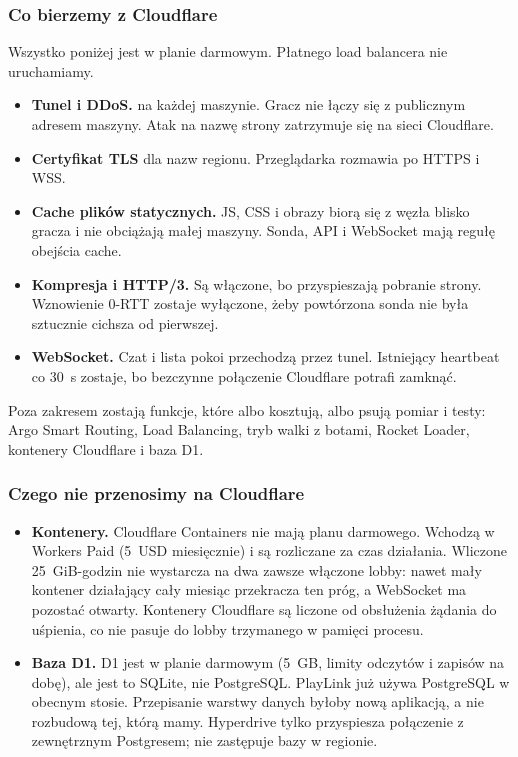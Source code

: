 \documentclass[12pt,a4paper]{article}
\newcommand{\code}[1]{\texttt{\detokenize{#1}}}
\begin{document}
\subsubsection{Co bierzemy z Cloudflare}
Wszystko poniżej jest w planie darmowym. Płatnego load balancera nie uruchamiamy.
\begin{itemize}
  \item \textbf{Tunel i DDoS.} \code{cloudflared} na każdej maszynie. Gracz nie
        łączy się z publicznym adresem maszyny. Atak na nazwę strony zatrzymuje
        się na sieci Cloudflare.
  \item \textbf{Certyfikat TLS} dla nazw regionu. Przeglądarka rozmawia po HTTPS i WSS.
  \item \textbf{Cache plików statycznych.} JS, CSS i obrazy biorą się z węzła
        blisko gracza i nie obciążają małej maszyny. Sonda, API i WebSocket
        mają regułę obejścia cache.
  \item \textbf{Kompresja i HTTP/3.} Są włączone, bo przyspieszają pobranie strony.
        Wznowienie 0-RTT zostaje wyłączone, żeby powtórzona sonda nie była
        sztucznie cichsza od pierwszej.
  \item \textbf{WebSocket.} Czat i lista pokoi przechodzą przez tunel. Istniejący
        heartbeat co 30~s zostaje, bo bezczynne połączenie Cloudflare potrafi zamknąć.
\end{itemize}
Poza zakresem zostają funkcje, które albo kosztują, albo psują pomiar i testy:
Argo Smart Routing, Load Balancing, tryb walki z botami, Rocket Loader,
kontenery Cloudflare i baza D1.

\subsubsection{Czego nie przenosimy na Cloudflare}
\begin{itemize}
  \item \textbf{Kontenery.} Cloudflare Containers nie mają planu darmowego.
        Wchodzą w Workers Paid (5~USD miesięcznie) i są rozliczane za czas
        działania. Wliczone 25~GiB-godzin nie wystarcza na dwa zawsze włączone
        lobby: nawet mały kontener działający cały miesiąc przekracza ten próg,
        a WebSocket ma pozostać otwarty. Kontenery Cloudflare są liczone od
        obsłużenia żądania do uśpienia, co nie pasuje do lobby trzymanego w
        pamięci procesu.
  \item \textbf{Baza D1.} D1 jest w planie darmowym (5~GB, limity odczytów
        i zapisów na dobę), ale jest to SQLite, nie PostgreSQL. PlayLink już
        używa PostgreSQL w obecnym stosie. Przepisanie warstwy danych
        byłoby nową aplikacją, a nie rozbudową tej, którą mamy. Hyperdrive tylko
        przyspiesza połączenie z zewnętrznym Postgresem; nie zastępuje bazy
        w regionie.
\end{itemize}
\end{document}
